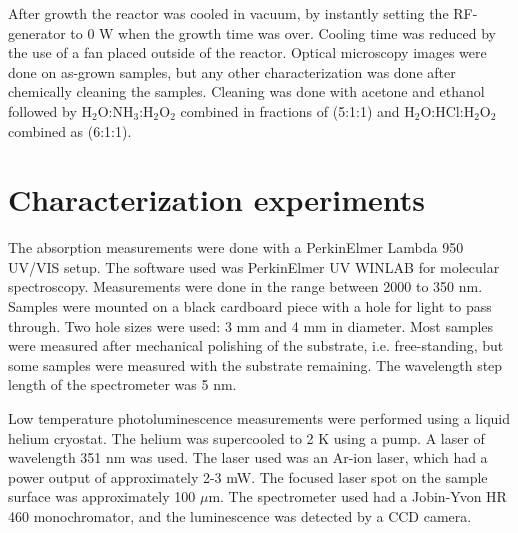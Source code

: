After growth the reactor was cooled in vacuum, by instantly setting the RF-generator to 0 W when the growth time was over. Cooling time was reduced by the use of a fan placed outside of the reactor. Optical microscopy images were done on as-grown samples, but any other characterization was done after chemically cleaning the samples. Cleaning was done with acetone and ethanol followed by H$_2$O:NH$_3$:H$_2$O$_2$ combined in fractions of (5:1:1) and H$_2$O:HCl:H$_2$O$_2$ combined as (6:1:1).

\section{Characterization experiments}
\label{sec:experimental:characterization}
The absorption measurements were done with a PerkinElmer Lambda 950 UV/VIS setup. The software used was PerkinElmer UV WINLAB for molecular spectroscopy. Measurements were done in the range between 2000 to 350 nm. Samples were mounted on a black cardboard piece with a hole for light to pass through. Two hole sizes were used: 3 mm and 4 mm in diameter. Most samples were measured after mechanical polishing of the substrate, i.e. free-standing, but some samples were measured with the substrate remaining. The wavelength step length of the spectrometer was 5 nm. 

Low temperature photoluminescence measurements were performed using a liquid helium cryostat. The helium was supercooled to 2 K using a pump. A laser of wavelength 351 nm was used. The laser used was an Ar-ion laser, which had a power output of approximately 2-3 mW. The focused laser spot on the sample surface was approximately 100 $\mu$m. The spectrometer used had a Jobin-Yvon HR 460 monochromator, and the luminescence was detected by a CCD camera. 









































